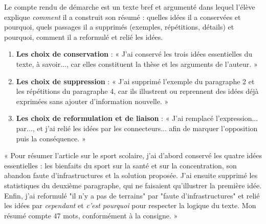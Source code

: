 \documentclass[11pt]{article}
\begin{document}
\begin{definition}
Le compte rendu de démarche est un texte bref et argumenté dans lequel l'élève explique \emph{comment} il a construit son résumé : quelles idées il a conservées et pourquoi, quels passages il a supprimés (exemples, répétitions, détails) et pourquoi, comment il a reformulé et relié les idées.
\end{definition}

\begin{methode}
\begin{enumerate}
\item \textbf{Les choix de conservation} : « J'ai conservé les trois idées essentielles du texte, à savoir..., car elles constituent la thèse et les arguments de l'auteur. »
\item \textbf{Les choix de suppression} : « J'ai supprimé l'exemple du paragraphe 2 et les répétitions du paragraphe 4, car ils illustrent ou reprennent des idées déjà exprimées sans ajouter d'information nouvelle. »
\item \textbf{Les choix de reformulation et de liaison} : « J'ai remplacé l'expression... par..., et j'ai relié les idées par les connecteurs... afin de marquer l'opposition puis la conséquence. »
\end{enumerate}
\end{methode}

\begin{exemplebox}
« Pour résumer l'article sur le sport scolaire, j'ai d'abord conservé les quatre idées essentielles : les bienfaits du sport sur la santé et sur la concentration, son abandon faute d'infrastructures et la solution proposée. J'ai ensuite supprimé les statistiques du deuxième paragraphe, qui ne faisaient qu'illustrer la première idée. Enfin, j'ai reformulé "il n'y a pas de terrains" par "faute d'infrastructures" et relié les idées par \emph{cependant} et \emph{c'est pourquoi} pour respecter la logique du texte. Mon résumé compte 47 mots, conformément à la consigne. »
\end{exemplebox}
\end{document}
